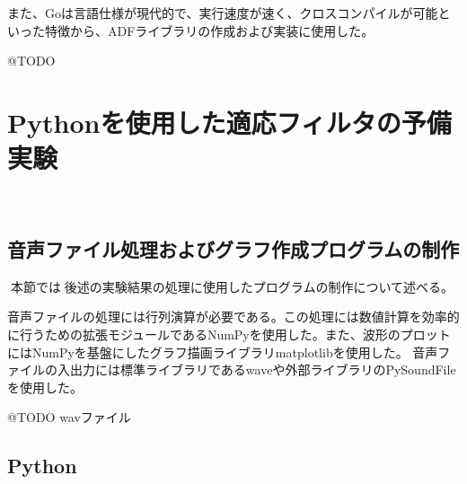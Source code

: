 また、Goは言語仕様が現代的で、実行速度が速く、クロスコンパイルが可能といった特徴から、ADFライブラリの作成および実装に使用した。

@TODO

\section{Pythonを使用した適応フィルタの予備実験}\label{python-experiment}

\
\subsection{音声ファイル処理およびグラフ作成プログラムの制作}\label{create-program}

本節では後述の実験結果の処理に使用したプログラムの制作について述べる。

音声ファイルの処理には行列演算が必要である。この処理には数値計算を効率的に行うための拡張モジュールであるNumPyを使用した。また、波形のプロットにはNumPyを基盤にしたグラフ描画ライブラリmatplotlibを使用した。
音声ファイルの入出力には標準ライブラリであるwaveや外部ライブラリのPySoundFileを使用した。

@TODO wavファイル

\subsection{Python}\label{python}

